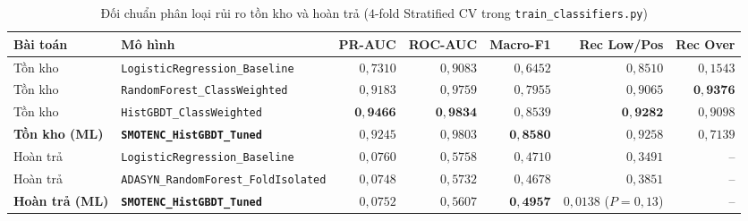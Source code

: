 \begin{table}[H]
	\centering
	\caption{Đối chuẩn phân loại rủi ro tồn kho và hoàn trả ($4$-fold Stratified CV trong \texttt{train\_classifiers.py})}
	\label{tab:ml-class-benchmark}
	\scriptsize
	\setlength{\tabcolsep}{3pt}
	\begin{tabular}{l p{4.2cm} r r r r r}
		\toprule
		\textbf{Bài toán}      & \textbf{Mô hình}                                         & \textbf{PR-AUC}     & \textbf{ROC-AUC}    & \textbf{Macro-F1}   & \textbf{Rec Low/Pos}    & \textbf{Rec Over}   \\
		\midrule
		Tồn kho                & \texttt{LogisticRegression\_\allowbreak{}Baseline}       & $0{,}7310$          & $0{,}9083$          & $0{,}6452$          & $0{,}8510$              & $0{,}1543$          \\
		Tồn kho                & \texttt{RandomForest\_\allowbreak{}ClassWeighted}        & $0{,}9183$          & $0{,}9759$          & $0{,}7955$          & $0{,}9065$              & $\mathbf{0{,}9376}$ \\
		Tồn kho                & \texttt{HistGBDT\_\allowbreak{}ClassWeighted}            & $\mathbf{0{,}9466}$ & $\mathbf{0{,}9834}$ & $0{,}8539$          & $\mathbf{0{,}9282}$     & $0{,}9098$          \\
		\textbf{Tồn kho (ML)}  & \textbf{\texttt{SMOTENC\_HistGBDT\_\allowbreak{}Tuned}}  & $0{,}9245$          & $0{,}9803$          & $\mathbf{0{,}8580}$ & $0{,}9258$              & $0{,}7139$          \\
		\midrule
		Hoàn trả               & \texttt{LogisticRegression\_\allowbreak{}Baseline}       & $0{,}0760$          & $0{,}5758$          & $0{,}4710$          & $0{,}3491$              & --                  \\
		Hoàn trả               & \texttt{ADASYN\_RandomForest\_\allowbreak{}FoldIsolated} & $0{,}0748$          & $0{,}5732$          & $0{,}4678$          & $0{,}3851$              & --                  \\
		\textbf{Hoàn trả (ML)} & \textbf{\texttt{SMOTENC\_HistGBDT\_\allowbreak{}Tuned}}  & $0{,}0752$          & $0{,}5607$          & $\mathbf{0{,}4957}$ & $0{,}0138$ ($P=0{,}13$) & --                  \\
		\bottomrule
	\end{tabular}
\end{table}

